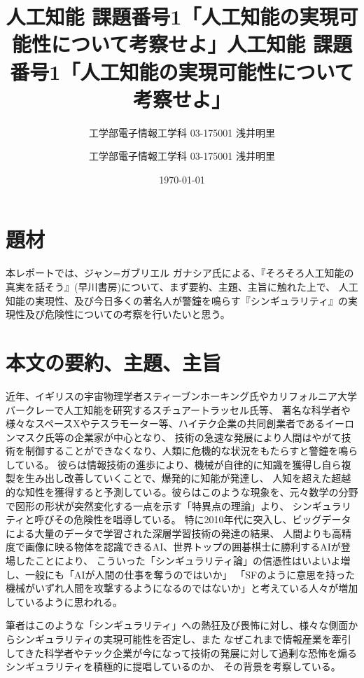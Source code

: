 \documentclass[uplatex]{jsarticle}
\title{人工知能 課題番号1「人工知能の実現可能性について考察せよ」}
\author{工学部電子情報工学科 03-175001 浅井明里}
\title{人工知能 課題番号1「人工知能の実現可能性について考察せよ」}
\author{工学部電子情報工学科 03-175001 浅井明里}
\date{\today}
\makeatletter
\def\maketitle{%
  \null
  \thispagestyle{empty}%
  \vfill
  \begin{center}\leavevmode
    \normalfont
    {\LARGE \@title\par}%
    \vskip 1cm
    {\Large \@author\par}%
    \vskip 1cm
    {\Large \@date\par}%
  \end{center}%
  \vfill
  \null
  \@thanks%
  \cleardoublepage
  }
\makeatother
\begin{document}
\maketitle

\section{題材}
本レポートでは、ジャン=ガブリエル ガナシア氏による、『そろそろ人工知能の真実を話そう』(早川書房)について、まず要約、主題、主旨に触れた上で、
人工知能の実現性、及び今日多くの著名人が警鐘を鳴らす『シンギュラリティ』の実現性及び危険性についての考察を行いたいと思う。

\section{本文の要約、主題、主旨}
近年、イギリスの宇宙物理学者スティーブンホーキング氏やカリフォルニア大学バークレーで人工知能を研究するスチュアートラッセル氏等、
著名な科学者や様々なスペースXやテスラモーター等、ハイテク企業の共同創業者であるイーロンマスク氏等の企業家が中心となり、
技術の急速な発展により人間はやがて技術を制御することができなくなり、人類に危機的な状況をもたらすと警鐘を鳴らしている。
彼らは情報技術の進歩により、機械が自律的に知識を獲得し自ら複製を生み出し改善していくことで、爆発的に知能が発達し、
人知を超えた超越的な知性を獲得すると予測している。彼らはこのような現象を、元々数学の分野で図形の形状が突然変化する一点を示す「特異点の理論」より、
シンギュラリティと呼びその危険性を唱導している。
特に2010年代に突入し、ビッグデータによる大量のデータで学習された深層学習技術の発達の結果、
人間よりも高精度で画像に映る物体を認識できるAI、世界トップの囲碁棋士に勝利するAIが登場したことにより、
こういった「シンギュラリティ論」の信憑性はいよいよ増し、一般にも「AIが人間の仕事を奪うのではいか」
「SFのように意思を持った機械がいずれ人間を攻撃するようになるのではないか」と考えている人々が増加しているように思われる。

筆者はこのような「シンギュラリティ」への熱狂及び畏怖に対し、様々な側面からシンギュラリティの実現可能性を否定し、また
なぜこれまで情報産業を牽引してきた科学者やテック企業が今になって技術の発展に対して過剰な恐怖を煽るシンギュラリティを積極的に提唱しているのか、
その背景を考察している。
\end{document}
